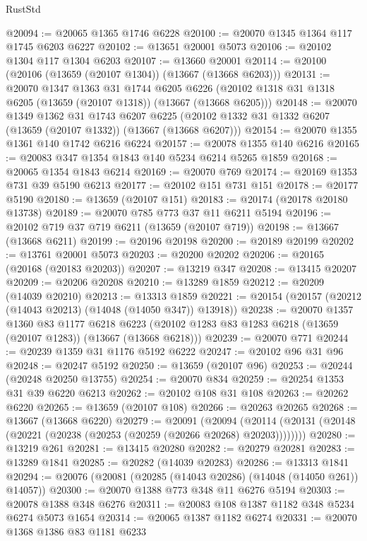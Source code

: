 \begin{lexlean}{RustStd}
\begin{coremodule}
@20094 := @20065 @1365 @1746 @6228
@20100 := @20070 @1345 @1364 @117 @1745 @6203 @6227
@20102 := @13651 @20001 @5073
@20106 := @20102 @1304 @117 @1304 @6203
@20107 := @13660 @20001
@20114 := @20100 (@20106 (@13659 (@20107 @1304)) (@13667 (@13668 @6203)))
@20131 := @20070
    @1347
    @1363
    @31
    @1744
    @6205
    @6226
    (@20102 @1318 @31 @1318 @6205 (@13659 (@20107 @1318)) (@13667 (@13668 @6205)))
@20148 := @20070
    @1349
    @1362
    @31
    @1743
    @6207
    @6225
    (@20102 @1332 @31 @1332 @6207 (@13659 (@20107 @1332)) (@13667 (@13668 @6207)))
@20154 := @20070 @1355 @1361 @140 @1742 @6216 @6224
@20157 := @20078 @1355 @140 @6216
@20165 := @20083 @347 @1354 @1843 @140 @5234 @6214 @5265 @1859
@20168 := @20065 @1354 @1843 @6214
@20169 := @20070 @769
@20174 := @20169 @1353 @731 @39 @5190 @6213
@20177 := @20102 @151 @731 @151
@20178 := @20177 @5190
@20180 := @13659 (@20107 @151)
@20183 := @20174 (@20178 @20180 @13738)
@20189 := @20070 @785 @773 @37 @11 @6211 @5194
@20196 := @20102 @719 @37 @719 @6211 (@13659 (@20107 @719))
@20198 := @13667 (@13668 @6211)
@20199 := @20196 @20198
@20200 := @20189 @20199
@20202 := @13761 @20001 @5073
@20203 := @20200 @20202
@20206 := @20165 (@20168 (@20183 @20203))
@20207 := @13219 @347
@20208 := @13415 @20207
@20209 := @20206 @20208
@20210 := @13289 @1859
@20212 := @20209 (@14039 @20210)
@20213 := @13313 @1859
@20221 := @20154 (@20157 (@20212 (@14043 @20213) (@14048 (@14050 @347)) @13918))
@20238 := @20070
    @1357
    @1360
    @83
    @1177
    @6218
    @6223
    (@20102 @1283 @83 @1283 @6218 (@13659 (@20107 @1283)) (@13667 (@13668 @6218)))
@20239 := @20070 @771
@20244 := @20239 @1359 @31 @1176 @5192 @6222
@20247 := @20102 @96 @31 @96
@20248 := @20247 @5192
@20250 := @13659 (@20107 @96)
@20253 := @20244 (@20248 @20250 @13755)
@20254 := @20070 @834
@20259 := @20254 @1353 @31 @39 @6220 @6213
@20262 := @20102 @108 @31 @108
@20263 := @20262 @6220
@20265 := @13659 (@20107 @108)
@20266 := @20263 @20265
@20268 := @13667 (@13668 @6220)
@20279 := @20091
    (@20094 (@20114 (@20131 (@20148 (@20221 (@20238 (@20253 (@20259 (@20266 @20268) @20203))))))))
@20280 := @13219 @261
@20281 := @13415 @20280
@20282 := @20279 @20281
@20283 := @13289 @1841
@20285 := @20282 (@14039 @20283)
@20286 := @13313 @1841
@20294 := @20076 (@20081 (@20285 (@14043 @20286) (@14048 (@14050 @261)) @14057))
@20300 := @20070 @1388 @773 @348 @11 @6276 @5194
@20303 := @20078 @1388 @348 @6276
@20311 := @20083 @108 @1387 @1182 @348 @5234 @6274 @5073 @1654
@20314 := @20065 @1387 @1182 @6274
@20331 := @20070
    @1368
    @1386
    @83
    @1181
    @6233

\end{coremodule}
\end{lexlean}
